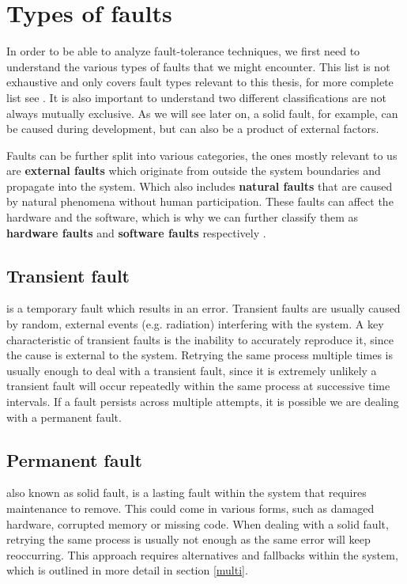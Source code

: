 \section{Types of faults}

In order to be able to analyze fault-tolerance techniques, we first need to understand the various types of faults that we might encounter. This list is not exhaustive and only covers fault types relevant to this thesis, for more complete list see \cite{1335465}. It is also important to understand two different classifications are not always mutually exclusive. As we will see later on, a solid fault, for example, can be caused during development, but can also be a product of external factors.

Faults can be further split into various categories, the ones mostly relevant to us are \textbf{external faults} which originate from outside the system boundaries and propagate into the system. Which also includes \textbf{natural faults} that are caused by natural phenomena without human participation. These faults can affect the hardware and the software, which is why we can further classify them as \textbf{hardware faults} and \textbf{software faults} respectively \cite{1335465}. \\

\subsection{Transient fault} is a temporary fault which results in an error. Transient faults are usually caused by random, external events (e.g. radiation) interfering with the system. A key characteristic of transient faults is the inability to accurately reproduce it, since the cause is external to the system. Retrying the same process multiple times is usually enough to deal with a transient fault, since it is extremely unlikely a transient fault will occur repeatedly within the same process at successive time intervals. If a fault persists across multiple attempts, it is possible we are dealing with a permanent fault. \\

\subsection{Permanent fault} also known as solid fault, is a lasting fault within the system that requires maintenance to remove. This could come in various forms, such as damaged hardware, corrupted memory or missing code. When dealing with a solid fault, retrying the same process is usually not enough as the same error will keep reoccurring. This approach requires alternatives and fallbacks within the system, which is outlined in more detail in section \ref{multi}. \\

